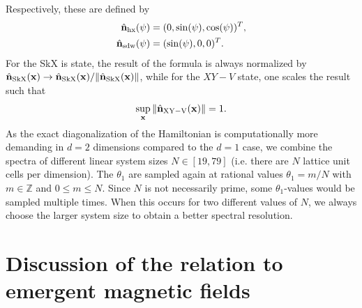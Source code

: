 \documentclass[
    10pt,
    aps,
    prb,
	longbibliography,
    twocolumn,
    floatfix,
    superscriptaddress,
]{revtex4-2}
\begin{document}
Respectively, these are defined by
\begin{align}
\hat{\mathbf{n}}_\mathrm{hx} (\psi) &=  (0, \sin(\psi), \cos(\psi))^T,
\\
\hat{\mathbf{n}}_\mathrm{sdw} (\psi) &=  (\sin(\psi),0,0)^T .
\end{align}
For the SkX is state, the result of the formula is always normalized by
$\hat{\mathbf{n}}_\mathrm{SkX}(\mathbf{x}) \to \hat{\mathbf{n}}_\mathrm{SkX}(\mathbf{x}) / \| \hat{\mathbf{n}}_\mathrm{SkX}(\mathbf{x})\| $, while for the $XY-V$ state, one scales the result such that
\begin{equation}
	\sup_{\mathbf{x}} \| 	\hat{\mathbf{n}}_\mathrm{XY-V}(\mathbf{x}) \| = 1.
\end{equation}	
As the exact diagonalization of the Hamiltonian is computationally more demanding in $d=2$ dimensions compared to the $d=1$ case, we combine the spectra of different linear system sizes $N\in[19, 79]$ (i.e. there are $N$ lattice unit cells per dimension).
The $\theta_1$ are sampled again at rational values $\theta_1 = m /N $ with $m \in \mathbb{Z}$ and $ 0\leq m \leq N$.
Since $N$ is not necessarily prime, some $\theta_1$-values would be sampled multiple times.
When this occurs for two different values of $N$, we always choose the larger system size to obtain a better spectral resolution. 


\section{Discussion of the relation to emergent magnetic fields}
\label{app:emergent_magnetic_fields}
\end{document}
